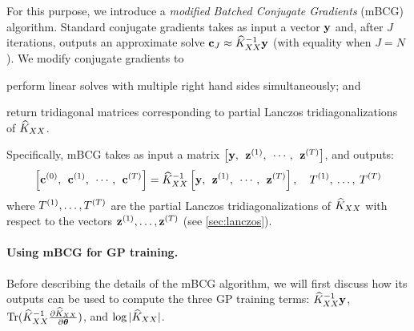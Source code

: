 For this purpose, we introduce a \emph{modified Batched Conjugate Gradients} (mBCG) algorithm.
Standard conjugate gradients takes as input a vector $\mathbf{y}$ and, after $J$ iterations, outputs an approximate solve $\mathbf{c}_{J} \approx \widehat{K}_{XX}^{-1}\mathbf{y}$ (with equality when $J = N$).
We modify conjugate gradients to
\begin{enumerate*}
  \item perform linear solves with multiple right hand sides simultaneously; and
  \item return tridiagonal matrices corresponding to partial Lanczos tridiagonalizations of $\widehat{K}_{XX}$.
\end{enumerate*}
Specifically, mBCG takes as input a matrix $\left[ \mathbf{y}, \:\: \mathbf{z}^{(1)}, \:\: \cdots, \:\: \mathbf{z}^{(T)} \right]$, and outputs:
\begin{equation}
  \label{eqn:mod_cg_call}
  \left[ \mathbf{c}^{(0)}, \:\: \mathbf{c}^{(1)}, \:\: \cdots, \:\: \mathbf{c}^{(T)} \right] = \widehat{K}_{XX}^{-1} \left[ \mathbf{y}, \:\: \mathbf{z}^{(1)}, \:\: \cdots, \:\: \mathbf{z}^{(T)} \right], \quad T^{(1)}, \: \ldots, \: T^{(T)}
\end{equation}
where $T^{(1)}, \ldots, T^{(T)}$ are the partial Lanczos tridiagonalizations of $\widehat{K}_{XX}$ with respect to the vectors $\mathbf{z}^{(1)}, \ldots, \mathbf{z}^{(T)}$ (see \cref{sec:lanczos}).

\paragraph{Using mBCG for GP training.}
Before describing the details of the mBCG algorithm, we will first discuss how its outputs can be used to compute the three GP training terms:
$\widehat{K}_{XX}^{-1} \mathbf{y}$, $\tr{ \trainK^{-1} \frac{\partial \trainK}{\partial \btheta} }$, and $\log \vert \widehat{K}_{XX} \vert$.

